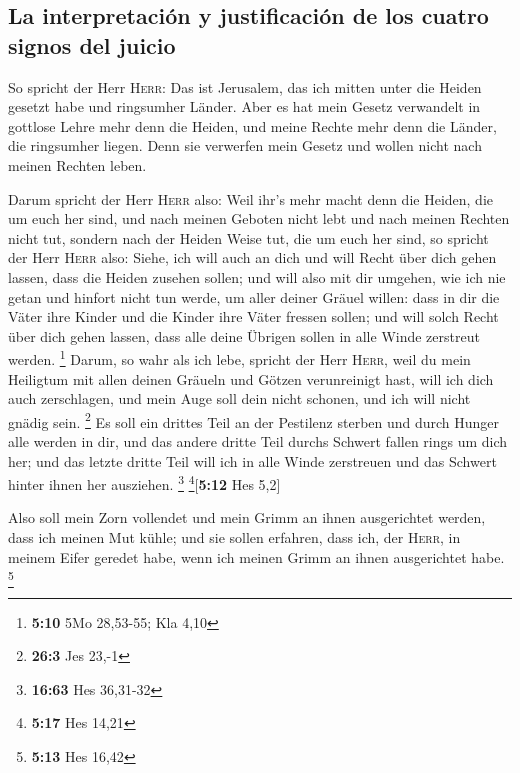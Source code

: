 \hypertarget{la-interpretaciuxf3n-y-justificaciuxf3n-de-los-cuatro-signos-del-juicio}{%
\subsection{La interpretación y justificación de los cuatro signos del
juicio}\label{la-interpretaciuxf3n-y-justificaciuxf3n-de-los-cuatro-signos-del-juicio}}

 So spricht der Herr \textsc{Herr}: Das ist Jerusalem, das
ich mitten unter die Heiden gesetzt habe und ringsumher Länder.
 Aber es hat mein Gesetz verwandelt in gottlose Lehre mehr
denn die Heiden, und meine Rechte mehr denn die Länder, die ringsumher
liegen. Denn sie verwerfen mein Gesetz und wollen nicht nach meinen
Rechten leben.

 Darum spricht der Herr \textsc{Herr} also: Weil ihr's
mehr macht denn die Heiden, die um euch her sind, und nach meinen
Geboten nicht lebt und nach meinen Rechten nicht tut, sondern nach der
Heiden Weise tut, die um euch her sind,  so spricht der
Herr \textsc{Herr} also: Siehe, ich will auch an dich und will Recht
über dich gehen lassen, dass die Heiden zusehen sollen; 
und will also mit dir umgehen, wie ich nie getan und hinfort nicht tun
werde, um aller deiner Gräuel willen:  dass in dir die
Väter ihre Kinder und die Kinder ihre Väter fressen sollen; und will
solch Recht über dich gehen lassen, dass alle deine Übrigen sollen in
alle Winde zerstreut werden. \footnote{\textbf{5:10} 5Mo 28,53-55; Kla
  4,10}  Darum, so wahr als ich lebe, spricht der Herr
\textsc{Herr}, weil du mein Heiligtum mit allen deinen Gräueln und
Götzen verunreinigt hast, will ich dich auch zerschlagen, und mein Auge
soll dein nicht schonen, und ich will nicht gnädig sein. \footnote{\textbf{26:3}
  Jes 23,-1}  Es soll ein drittes Teil an der Pestilenz
sterben und durch Hunger alle werden in dir, und das andere dritte Teil
durchs Schwert fallen rings um dich her; und das letzte dritte Teil will
ich in alle Winde zerstreuen und das Schwert hinter ihnen her ausziehen.
\footnote{\textbf{16:63} Hes 36,31-32} \footnote{\textbf{5:17} Hes 14,21}{[}\textbf{5:12}
Hes 5,2{]}

 Also soll mein Zorn vollendet und mein Grimm an ihnen
ausgerichtet werden, dass ich meinen Mut kühle; und sie sollen erfahren,
dass ich, der \textsc{Herr}, in meinem Eifer geredet habe, wenn ich
meinen Grimm an ihnen ausgerichtet habe. \footnote{\textbf{5:13} Hes
  16,42}

